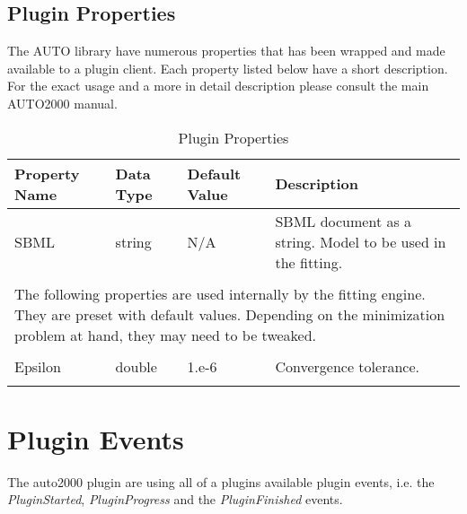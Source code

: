 \begin{landscape}
\section{Plugin Properties}
The AUTO library have numerous properties that has been wrapped and made available to a plugin client. Each property listed below have a short description. For the exact usage and a more in detail description please consult the main AUTO2000 manual.


\centering %
\begin{longtable}{p{4cm} l p{3cm}  p{10cm}} %

Property Name & Data Type & Default Value  & Description \\ [0.5ex] %
\hline %
SBML                            &   string              & N/A    &   SBML document as a string. Model to be used in the fitting. \\

\\[2pt]                                                               
\multicolumn{4}{p{19cm}}{The following properties are used internally by the fitting engine. They are preset with default values. Depending on the minimization problem at hand, they may need to be tweaked. } \\[12pt]
\hline %
\\[2pt]                                                               
Epsilon                         &   double              & 1.e-6          		&   Convergence tolerance. \\
                                                        
\hline %
\caption{Plugin Properties} 
\label{table:autoPluginProperties} 
\end{longtable}

\end{landscape}

\section{Plugin Events}
The auto2000 plugin are using all of a plugins available plugin events, i.e. the \emph{PluginStarted}, \emph{PluginProgress} and the \emph{PluginFinished} events.

